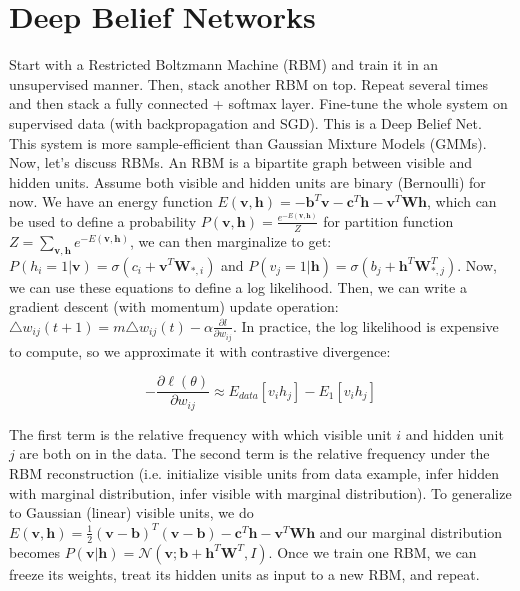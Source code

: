 \documentclass[a4paper]{article}
\begin{document}
\section{Deep Belief Networks}
Start with a Restricted Boltzmann Machine (RBM) and train it in an unsupervised
manner. Then, stack another RBM on top. Repeat several times and then stack
a fully connected + softmax layer. Fine-tune the whole system on supervised
data (with backpropagation and SGD). This is a Deep Belief Net. This system
is more sample-efficient than Gaussian Mixture Models (GMMs). Now, let's
discuss RBMs. An RBM is a bipartite graph between visible and hidden units.
Assume both visible and hidden units are binary (Bernoulli) for now. We have
an energy function $E(\mathbf{v}, \mathbf{h}) = - \mathbf{b}^T \mathbf{v}
- \mathbf{c}^T \mathbf{h} - \mathbf{v}^T \mathbf{W} \mathbf{h}$, which
can be used to define a probability $P(\mathbf{v}, \mathbf{h}) = \frac{
e^{-E(\mathbf{v}, \mathbf{h})}}{Z}$ for partition function $Z = \sum_{\mathbf{v
, h}}{e^{-E(\mathbf{v}, \mathbf{h})}}$, we can then marginalize to get:
$P(h_i = 1 | \mathbf{v}) = \sigma(c_i + \mathbf{v}^T \mathbf{W}_{*, i})$ and
$P(v_j = 1 | \mathbf{h}) = \sigma(b_j + \mathbf{h}^T \mathbf{W}^T_{*, j})$.
Now, we can use these equations to define a log likelihood. Then, we can
write a gradient descent (with momentum) update operation:
$\triangle w_{ij}(t+1) = m \triangle w_{ij}(t) - \alpha \frac{\partial l}{
\partial w_{ij}}$. In practice, the log likelihood is expensive to compute, so
we approximate it with contrastive divergence:

$$
- \frac{\partial \ell(\theta)}{\partial w_{ij}} \approx E_{data}[v_i h_j]
- E_1[v_i h_j]
$$

The first term is the relative frequency with which visible unit $i$ and 
hidden unit $j$ are both on in the data. The second term is the relative
frequency under the RBM reconstruction (i.e. initialize visible units from data
example, infer hidden with marginal distribution, infer visible with marginal
distribution). To generalize to Gaussian (linear) visible units, we do
$E(\mathbf{v}, \mathbf{h}) = \frac{1}{2} (\mathbf{v} - \mathbf{b})^T 
(\mathbf{v} - \mathbf{b}) - \mathbf{c}^T \mathbf{h} - \mathbf{v}^T
\mathbf{W} \mathbf{h}$ and our marginal distribution becomes $P(\mathbf{v}|
\mathbf{h}) = \mathcal{N}(\mathbf{v}; \mathbf{b} + \mathbf{h}^T
\mathbf{W}^T, I)$. Once we train one RBM, we can freeze its weights, treat
its hidden units as input to a new RBM, and repeat.
\end{document}
